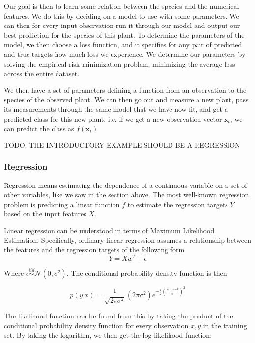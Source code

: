 Our goal is then to learn some relation between the species and the numerical
features. We do this by deciding on a model to use with some parameters. We can
then for every input observation run it through our model and output our best
prediction for the species of this plant. To determine the parameters of the
model, we then choose a loss function, and it specifies for any pair of
predicted and true targets how much loss we experience. We determine our
parameters by solving the empirical risk minimization problem, minimizing
the average loss across the entire dataset. 


We then have a set of parameters defining a function from an observation to the
species of the observed plant. We can then go out and measure a new plant, pass
its measurements through the same model that we have now fit, and get a
predicted class for this new plant. i.e. if we get a new observation vector
$\mathbf{x}_t$, we can predict the class as $f(\mathbf{x}_t)$

TODO: THE INTRODUCTORY EXAMPLE SHOULD BE A REGRESSION


\subsubsection{Regression}

Regression means estimating the dependence of a continuous variable on a set of
other variables, like we saw in the section above. The most well-known
regression problem is predicting a linear function $f$ to estimate the
regression targets $Y$ based on the input features $X$.

Linear regression can be understood in terms of Maximum Likelihood Estimation.
Specifically, ordinary linear regression assumes a relationship between the
features and the regression targets of the following form
\begin{equation}
  Y = X w^T + \epsilon
\end{equation}

Where $\epsilon \overset{iid}{\sim} \mathcal N(0, \sigma^2)$. The conditional
probability density function is then

\begin{equation}
  p(y | x) = \frac{1}{\sqrt{2 \pi \sigma^2}}(2 \pi \sigma^2 )e^{-\frac 1 2 (\frac {y - x w^T}{\sigma})^2}
\end{equation}

The likelihood function can be found from this by taking the product of the
conditional probability density function for every observation $x,y$ in the
training set. By taking the logarithm, we then get the log-likelihood function:


